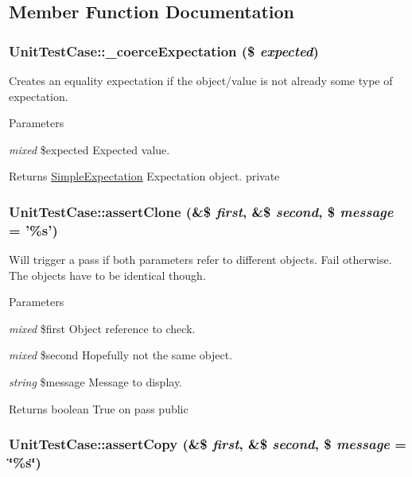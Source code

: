 \subsection{Member Function Documentation}
\hypertarget{class_unit_test_case_a643f146bf847fb7e1cabe481ea10596d}{
\subsubsection[{\_\-coerceExpectation}]{\setlength{\rightskip}{0pt plus 5cm}UnitTestCase::\_\-coerceExpectation (\$ {\em expected})}}
\label{class_unit_test_case_a643f146bf847fb7e1cabe481ea10596d}
Creates an equality expectation if the object/value is not already some type of expectation. 
\begin{DoxyParams}{Parameters}
\item[{\em mixed}]\$expected Expected value. \end{DoxyParams}
\begin{DoxyReturn}{Returns}
\hyperlink{class_simple_expectation}{SimpleExpectation} Expectation object.  private 
\end{DoxyReturn}
\hypertarget{class_unit_test_case_aa36296ec9f5b8f98ec70dd1903fb2ef5}{
\subsubsection[{assertClone}]{\setlength{\rightskip}{0pt plus 5cm}UnitTestCase::assertClone (\&\$ {\em first}, \/  \&\$ {\em second}, \/  \$ {\em message} = {\ttfamily '\%s'})}}
\label{class_unit_test_case_aa36296ec9f5b8f98ec70dd1903fb2ef5}
Will trigger a pass if both parameters refer to different objects. Fail otherwise. The objects have to be identical though. 
\begin{DoxyParams}{Parameters}
\item[{\em mixed}]\$first Object reference to check. \item[{\em mixed}]\$second Hopefully not the same object. \item[{\em string}]\$message Message to display. \end{DoxyParams}
\begin{DoxyReturn}{Returns}
boolean True on pass  public 
\end{DoxyReturn}
\hypertarget{class_unit_test_case_a457392b00e8cfb893e519e8bc4fa1749}{
\subsubsection[{assertCopy}]{\setlength{\rightskip}{0pt plus 5cm}UnitTestCase::assertCopy (\&\$ {\em first}, \/  \&\$ {\em second}, \/  \$ {\em message} = {\ttfamily \char`\"{}\%s\char`\"{}})}}
